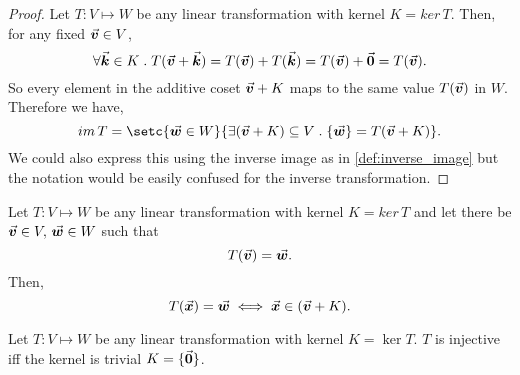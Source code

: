 \documentclass[../MathsNotesBase.tex]{subfiles}
\begin{document}
{		\medskip
		\begin{proof}
			Let ${ T: V \longmapsto W }$ be any linear transformation with kernel ${ K = ker\,T }$. Then, for any fixed ${ \vec{\bm{v}} \in V }$,
			\[ \forall \vec{\bm{k}} \in K \;.\; T(\vec{\bm{v}} + \vec{\bm{k}}) = T(\vec{\bm{v}}) + T(\vec{\bm{k}}) = T(\vec{\bm{v}}) + \vec{\bm{0}} = T(\vec{\bm{v}}). \]
			So every element in the additive coset ${ \vec{\bm{v}} + K }$ maps to the same value $T(\vec{\bm{v}})$ in $W$. Therefore we have,
			\[ im\,T = \setc{\w \in W}{\exists (\v + K) \subseteq V \logicsep \{\w\} = T(\v + K)}. \]
			We could also express this using the inverse image as in \ref{def:inverse_image} but the notation would be easily confused for the inverse transformation.
		\end{proof}
		\smallskip
		\begin{corollary}
			Let ${ T: V \longmapsto W }$ be any linear transformation with kernel ${ K = ker\,T }$ and let there be ${ \vec{\bm{v}} \in V,\, \vec{\bm{w}} \in W }$ such that 
				\[ T(\vec{\bm{v}}) = \vec{\bm{w}}. \] 
			Then,
				\[ T(\vec{\bm{x}}) = \vec{\bm{w}} \iff \vec{\bm{x}} \in (\vec{\bm{v}} + K). \]
		\end{corollary}
		\begin{corollary}\label{coro:linear-transformation-is-injective-iff-kernel-is-trivial}
			Let ${ T: V \longmapsto W }$ be any linear transformation with kernel ${ K = \operatorname{ker} T }$. $T$ is injective iff the kernel is trivial ${ K = \{\vec{\bm{0}}\} }$.
		\end{corollary}
	
}
\end{document}
